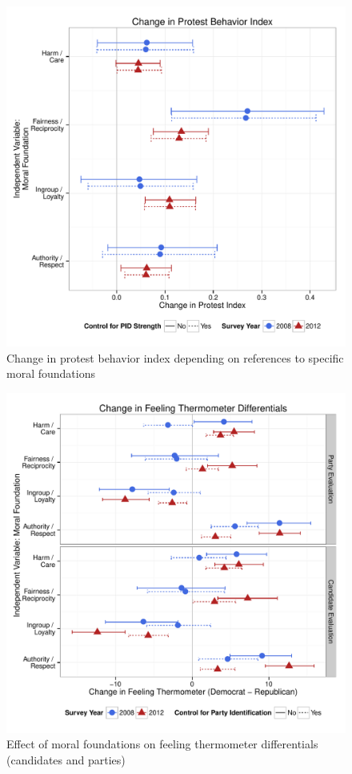 \documentclass[12pt]{article}
\begin{document}
\begin{figure}\centering
\includegraphics[scale=.4]{../calc/fig/appD10part.pdf}
\caption{Change in protest behavior index depending on references to specific moral foundations}\label{fig:appD10part}
\end{figure}

\begin{figure}\centering
\includegraphics[scale=.4]{../calc/fig/appD11feel.pdf}
\caption{Effect of moral foundations on feeling thermometer differentials (candidates and parties)}\label{fig:appD11feel}
\end{figure}
\end{document}
